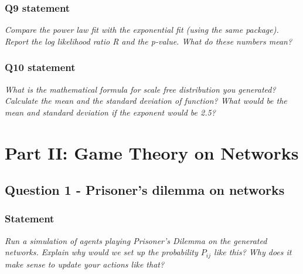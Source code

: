 \documentclass{article}
\begin{document}
\subsubsection{Q9 statement}
\textit{Compare the power law fit with the exponential fit (using the same package). Report the log likelihood ratio R and the p-value. What do these numbers mean?}


\subsubsection{Q10 statement}
\textit{What is the mathematical formula for scale free distribution you generated? Calculate the mean and the standard deviation of function? What would be the mean and standard deviation if the exponent would be 2.5?}

\newpage 
\section{Part II: Game Theory on Networks}

\subsection{Question 1 - Prisoner's dilemma on networks}

\subsubsection*{Statement}
\textit{Run a simulation of agents playing Prisoner's Dilemma on the generated networks. Explain why would we set up the probability $P_{ij}$ like this? Why does it make sense to update your actions like that?} 
\end{document}
